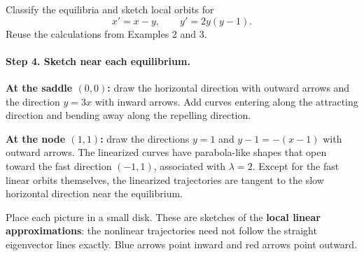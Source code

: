 \documentclass[10pt,letterpaper]{article}
\newcommand{\localpictures}{
    \begin{scope}
        \clip (0,0) circle (.38);
        \foreach \a in {-.07,.07}{
            \foreach \b in {-.035,.035}{
                \draw[thick,gray!80!black]
                    plot[domain=-1.5:2,samples=85,variable=\t]
                    ({\a*exp(\t)+\b*exp(-2*\t)},
                     {3*\b*exp(-2*\t)});
                \draw[->,thick,gray!80!black]
                    plot[domain=-.08:.15,samples=12,variable=\t]
                    ({\a*exp(\t)+\b*exp(-2*\t)},
                     {3*\b*exp(-2*\t)});
            }
        }
        \draw[red,thick] (-.4,0)--(.4,0);
        \draw[blue,thick,dashed] (-.15,-.45)--(.15,.45);
        \foreach \s in {-1,1}{
            \draw[->,red,thick] ({.12*\s},0)--({.29*\s},0);
            \draw[->,blue,thick]
                ({.09*\s},{.27*\s})--({.04*\s},{.12*\s});
        }
    \end{scope}
    \begin{scope}[shift={(1,1)}]
        \clip (0,0) circle (.38);
        \foreach \a in {-.11,.11}{
            \foreach \b in {-.055,.055}{
                \draw[thick,gray!80!black]
                    plot[domain=-3:1.5,samples=85,variable=\t]
                    ({\a*exp(\t)-\b*exp(2*\t)},
                     {\b*exp(2*\t)});
                \draw[->,thick,gray!80!black]
                    plot[domain=-.12:.12,samples=12,variable=\t]
                    ({\a*exp(\t)-\b*exp(2*\t)},
                     {\b*exp(2*\t)});
            }
        }
        \draw[red,thick] (-.4,0)--(.4,0);
        \draw[red,thick,dashed] (-.3,.3)--(.3,-.3);
        \foreach \s in {-1,1}{
            \draw[->,red,thick] ({.12*\s},0)--({.29*\s},0);
            \draw[->,red,thick]
                ({-.09*\s},{.09*\s})--({-.21*\s},{.21*\s});
        }
    \end{scope}
    \draw[dashed,gray] (0,0) circle (.38);
    \draw[dashed,gray] (1,1) circle (.38);
    \fill (0,0) circle (.6pt);
    \fill (1,1) circle (.6pt);
    \node[below right,font=\small] at (0,-.04) {$(0,0)$};
    \node[above right,font=\small] at (1.02,1.02) {$(1,1)$};
}
\begin{document}
\begin{example}[5]{
Classify the equilibria and sketch local orbits for
\[
x'=x-y,\qquad y'=2y(y-1).
\]
Reuse the calculations from Examples 2 and 3.
}
\paragraph{Step 4. Sketch near each equilibrium.}

\textbf{At the saddle $(0,0)$:} draw the horizontal direction with outward arrows and the direction $y=3x$ with inward arrows. Add curves entering along the attracting direction and bending away along the repelling direction.

\textbf{At the node $(1,1)$:} draw the directions $y=1$ and $y-1=-(x-1)$ with outward arrows. The linearized curves have parabola-like shapes that open toward the fast direction $(-1,1)$, associated with $\lambda=2$. Except for the fast linear orbits themselves, the linearized trajectories are tangent to the slow horizontal direction near the equilibrium.


\begin{center}
\end{center}

Place each picture in a small disk. These are sketches of the \textbf{local linear approximations}: the nonlinear trajectories need not follow the straight eigenvector lines exactly. Blue arrows point inward and red arrows point outward.
\end{example}


\end{document}
